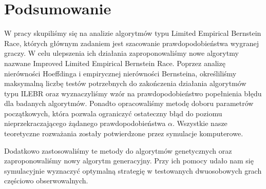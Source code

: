 \documentclass[inzynierska]{pwr_wmat_praca_dyplomowa}
\theoremstyle{plain}
\numberwithin{theorem}{chapter}
\theoremstyle{definition}
\numberwithin{theorem}{chapter}
\begin{document}
	
	
{\backmatter \chapter{Podsumowanie}}
W pracy skupiliśmy się na analizie algorytmów typu Limited Empirical Bernstein Race, których głównym zadaniem jest szacowanie prawdopodobieństwa wygranej graczy.  W celu ulepszenia ich działania zaproponowaliśmy nowe algorytmy nazwane Improved Limited Empirical Bernstein Race. Poprzez analizę nierówności Hoeffdinga i empirycznej nierówności Bernsteina, określiliśmy maksymalną liczbę testów potrzebnych do zakończenia działania algorytmów typu ILEBR oraz wyznaczyliśmy wzór na prawdopodobieństwo popełnienia błędu dla badanych algorytmów. Ponadto opracowaliśmy metodę doboru parametrów początkowych, która pozwala ograniczyć ostateczny błąd do poziomu nieprzekraczającego żądanego prawdopodobieństwa $\alpha$. Wszystkie nasze teoretyczne rozważania zostały potwierdzone przez symulacje komputerowe.

Dodatkowo zastosowaliśmy te metody do algorytmów genetycznych oraz zaproponowaliśmy nowy algorytm generacyjny. Przy ich pomocy udało nam się symulacyjnie wyznaczyć optymalną strategię w testowanych dwuosobowych grach częściowo obserwowalnych. 


{\appendix  \chapter[Dodatek]{}} 
\end{document}
